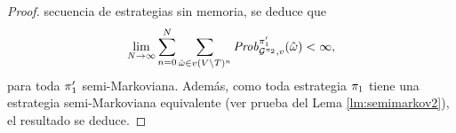 \begin{proof}
  secuencia de estrategias sin memoria, se deduce que
  \[
  \lim_{N \to \infty} \sum^{N}_{n=0} \sum_{\hat{\omega} \in v(V \setminus T)^n} \mathit{Prob}^{\pi_{1}'}_{\mathcal{G}^{\pi_{2}}, v}(\hat{\omega}) < \infty,
  \]
  para toda $\pi_{1}'$ semi-Markoviana.  Además, como toda
  estrategia $\pi_{1}$ tiene una estrategia semi-Markoviana equivalente (ver prueba del Lema \ref{lm:semimarkov2}), el resultado se deduce.
  \qedhere
\end{proof}





